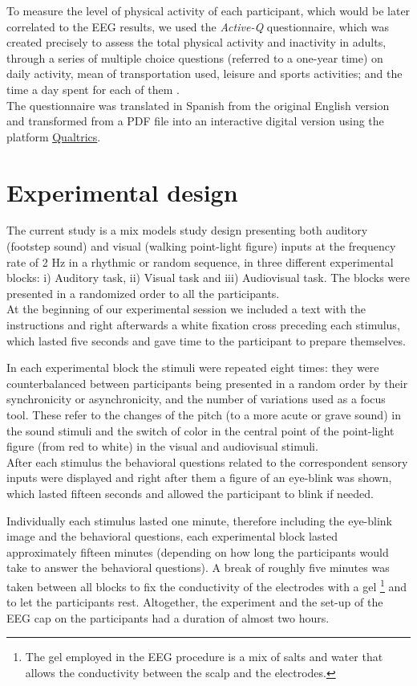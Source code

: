 To measure the level of physical activity of each participant, which would be later correlated to the EEG results, we used the \textit{Active-Q} questionnaire, which was created precisely to assess the total physical activity and inactivity in adults, through a series of multiple choice questions (referred to a one-year time) on daily activity, mean of transportation used, leisure and sports activities; and the time a day spent for each of them \parencite{Bonn_2012}. \\
The questionnaire was translated in Spanish from the original English version and transformed from a PDF file into an interactive digital version using the platform \href{https://www.qualtrics.com/uk/?rid=ip&prevsite=en&newsite=uk&geo=ES&geomatch=uk}{Qualtrics}. 

\section{Experimental design}
The current study is a mix models study design presenting both auditory (footstep sound) and visual (walking point-light figure) inputs at the frequency rate of 2 Hz in a rhythmic or random sequence, in three different experimental blocks: i) Auditory task, ii) Visual task and iii) Audiovisual task. The blocks were presented in a randomized order to all the participants. \\
At the beginning of our experimental session we included a text with the instructions and right afterwards a white fixation cross preceding each stimulus, which lasted five seconds and gave time to the participant to prepare themselves. 

In each experimental block the stimuli were repeated eight times: they were counterbalanced between participants being presented in a random order by their synchronicity or asynchronicity, and the number of variations used as a focus tool. These refer to the changes of the pitch (to a more acute or grave sound) in the sound stimuli and the switch of color in the central point of the point-light figure (from red to white) in the visual and audiovisual stimuli. \\
After each stimulus the behavioral questions related to the correspondent sensory inputs were displayed and right after them a figure of an eye-blink was shown, which lasted fifteen seconds and allowed the participant to blink if needed.

Individually each stimulus lasted one minute, therefore including the eye-blink image and the behavioral questions, each experimental block lasted approximately fifteen minutes (depending on how long the participants would take to answer the behavioral questions). A break of roughly five minutes was taken between all blocks to fix the conductivity of the electrodes with a gel \footnote{The gel employed in the EEG procedure is a mix of salts and water that allows the conductivity between the scalp and the electrodes.} and to let the participants rest. Altogether, the experiment and the set-up of the EEG cap on the participants had a duration of almost two hours.


